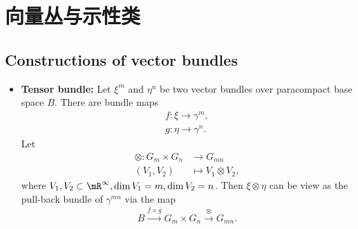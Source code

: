 \chapter{向量丛与示性类}
    \section{Constructions of vector bundles}
        \begin{itemize}
            \item \textbf{Tensor bundle:} Let $\xi^m$ and $\eta^n$ 
            be two vector bundles over paracompact base space $B$. 
            There are bundle maps 
            \begin{gather*}
            f:\xi\rightarrow\gamma^m, \\
            g:\eta\rightarrow\gamma^n.
            \end{gather*}
            Let 
            \begin{align*}
                \otimes:G_m\times G_n&\rightarrow G_{mn} \\
                (V_1,V_2)&\mapsto V_1\otimes V_2, 
            \end{align*}
            where $V_1, V_2\subset\mR^{\infty}, \dim V_1 = m, \dim V_2 = n$. 
            Then $\xi\otimes\eta$ can be view as the pull-back bundle of $\gamma^{mn}$ via the map 
            \begin{equation*}
                B\xrightarrow{\bar{f}\times\bar{g}}G_m\times G_n\xrightarrow{\otimes}G_{mn}.
            \end{equation*}
        \end{itemize}